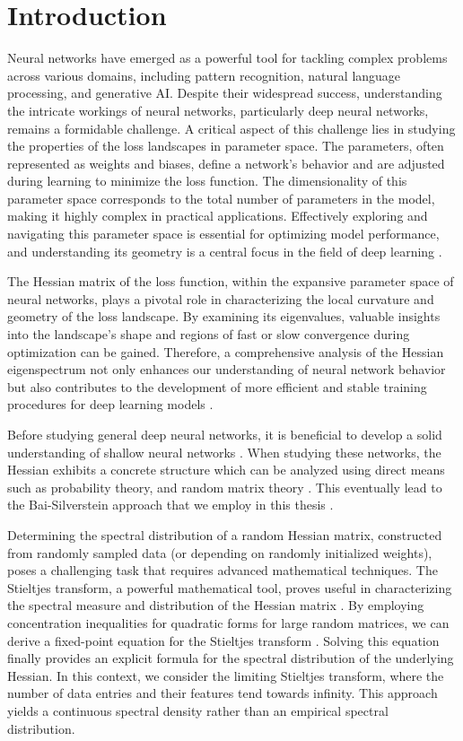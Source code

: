 \documentclass{article}
\begin{document}
\section{Introduction}
Neural networks have emerged as a powerful tool for tackling complex problems across various domains, including pattern recognition, natural language processing, and generative AI. Despite their widespread success, understanding the intricate workings of neural networks, particularly deep neural networks, remains a formidable challenge. A critical aspect of this challenge lies in studying the properties of the loss landscapes in parameter space. The parameters, often represented as weights and biases, define a network's behavior and are adjusted during learning to minimize the loss function. The dimensionality of this parameter space corresponds to the total number of parameters in the model, making it highly complex in practical applications. Effectively exploring and navigating this parameter space is essential for optimizing model performance, and understanding its geometry is a central focus in the field of deep learning \cite{pennington,orvieto}.
\bigskip
\par
The Hessian matrix of the loss function, within the expansive parameter space of neural networks, plays a pivotal role in characterizing the local curvature and geometry of the loss landscape. By examining its eigenvalues, valuable insights into the landscape's shape and regions of fast or slow convergence during optimization can be gained. Therefore, a comprehensive analysis of the Hessian eigenspectrum not only enhances our understanding of neural network behavior but also contributes to the development of more efficient and stable training procedures for deep learning models \cite{Liao, wu, sankar, kawaguchi}.
\par
Before studying general deep neural networks, it is beneficial to develop a solid understanding of shallow neural networks \cite{pennington2, piccolo, soltanolkotabi, arjevani}. When studying these networks, the Hessian exhibits a concrete structure which can be analyzed using direct means such as probability theory, and random matrix theory \cite{couillet, benigni, louart, hachem, vershynin, tao}. This eventually lead to the Bai-Silverstein approach that we employ in this thesis \cite{bai}.
\bigskip
\par
Determining the spectral distribution of a random Hessian matrix, constructed from randomly sampled data (or depending on randomly initialized weights), poses a challenging task that requires advanced mathematical techniques. The Stieltjes transform, a powerful mathematical tool, proves useful in characterizing the spectral measure and distribution of the Hessian matrix \cite{couillet}. By employing concentration inequalities for quadratic forms for large random matrices, we can derive a fixed-point equation for the Stieltjes transform \cite{couillet, rudelson, louart}. Solving this equation finally provides an explicit formula for the spectral distribution of the underlying Hessian. In this context, we consider the limiting Stieltjes transform, where the number of data entries and their features tend towards infinity. This approach yields a continuous spectral density rather than an empirical spectral distribution.
\end{document}
